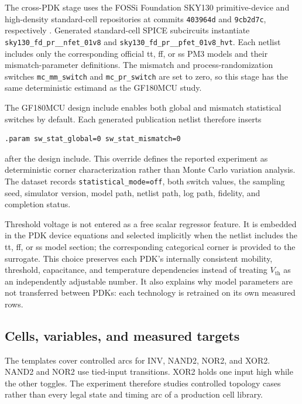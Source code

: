 \documentclass[preprint,12pt]{elsarticle}
\begin{document}
The cross-PDK stage uses the FOSSi Foundation SKY130 primitive-device and high-density standard-cell repositories at commits \texttt{403964d} and \texttt{9cb2d7c}, respectively \cite{FOSSi_SKY130_Primitive_GitHub,FOSSi_SKY130_HD_GitHub}. Generated standard-cell SPICE subcircuits instantiate \texttt{sky130\_fd\_pr\_\_nfet\_01v8} and \texttt{sky130\_fd\_pr\_\_pfet\_01v8\_hvt}. Each netlist includes only the corresponding official tt, ff, or ss PM3 models and their mismatch-parameter definitions. The mismatch and process-randomization switches \texttt{mc\_mm\_switch} and \texttt{mc\_pr\_switch} are set to zero, so this stage has the same deterministic estimand as the GF180MCU study.

The GF180MCU design include enables both global and mismatch statistical switches by default. Each generated publication netlist therefore inserts

\begin{verbatim}
.param sw_stat_global=0 sw_stat_mismatch=0
\end{verbatim}

after the design include. This override defines the reported experiment as deterministic corner characterization rather than Monte Carlo variation analysis. The dataset records \texttt{statistical\_mode=off}, both switch values, the sampling seed, simulator version, model path, netlist path, log path, fidelity, and completion status.

Threshold voltage is not entered as a free scalar regressor feature. It is embedded in the PDK device equations and selected implicitly when the netlist includes the tt, ff, or ss model section; the corresponding categorical corner is provided to the surrogate. This choice preserves each PDK's internally consistent mobility, threshold, capacitance, and temperature dependencies instead of treating $V_{\mathrm{th}}$ as an independently adjustable number. It also explains why model parameters are not transferred between PDKs: each technology is retrained on its own measured rows.

\subsection{Cells, variables, and measured targets}

The templates cover controlled arcs for INV, NAND2, NOR2, and XOR2. NAND2 and NOR2 use tied-input transitions. XOR2 holds one input high while the other toggles. The experiment therefore studies controlled topology cases rather than every legal state and timing arc of a production cell library.
\end{document}
